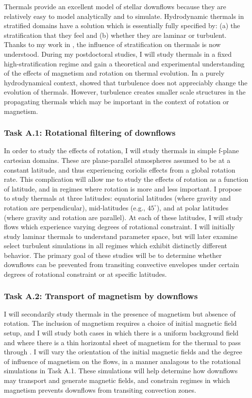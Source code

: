 \documentclass[aasms,11pt]{article}
\begin{document}
Thermals provide an excellent model of stellar downflows because they are relatively easy to model analytically and to simulate.
Hydrodynamic thermals in stratified domains have a solution which is essentially fully specified by: (a) the stratification that they feel and (b) whether they are laminar or turbulent.
Thanks to my work in \citet{andersLB2019}, the influence of stratification on thermals is now understood.
During my postdoctoral studies, I will study thermals in a fixed high-stratification regime and gain a theoretical and experimental understanding of the effects of magnetism and rotation on thermal evolution.
In a purely hydrodynamical context, \citet{lecoanet&jeevanjee2019} showed that turbulence does not appreciably change the evolution of thermals.
However, turbulence creates smaller scale structures in the propagating thermals which may be important in the context of rotation or magnetism.

\subsubsection{Task A.1: Rotational filtering of downflows}
In order to study the effects of rotation, I will study thermals in simple f-plane cartesian domains.
These are plane-parallel atmospheres assumed to be at a constant latitude, and thus experiencing coriolis effects from a global rotation rate.
This complication will allow me to study the effects of rotation as a function of latitude, and in regimes where rotation is more and less important.
I propose to study thermals at three latitudes: equatorial latitudes (where gravity and rotation are perpendicular), mid-latitudes (e.g., $45^\circ$), and at polar latitudes (where gravity and rotation are parallel).
At each of these latitudes, I will study flows which experience varying degrees of rotational constraint.
I will initially study laminar thermals to understand parameter space, but will later examine select turbulent simulations in all regimes which exhibit distinctly different behavior.
The primary goal of these studies will be to determine whether downflows can be prevented from transiting convective envelopes under certain degrees of rotational constraint or at specific latitudes.

\subsubsection{Task A.2: Transport of magnetism by downflows}
I will secondarily study thermals in the presence of magnetism but absence of rotation.
The inclusion of magnetism requires a choice of initial magnetic field setup, and I will study both cases in which there is a uniform background field and where there is a thin horizontal sheet of magnetism for the thermal to pass through \citep[as in][]{tobias&all1998}.
I will vary the orientation of the initial magnetic fields and the degree of influence of magnetism on the flows, in a manner analagous to the rotational simulations in Task A.1.
These simulations will help determine how downflows may transport and generate magnetic fields, and constrain regimes in which magnetism prevents downflows from transiting convection zones. 
\end{document}
